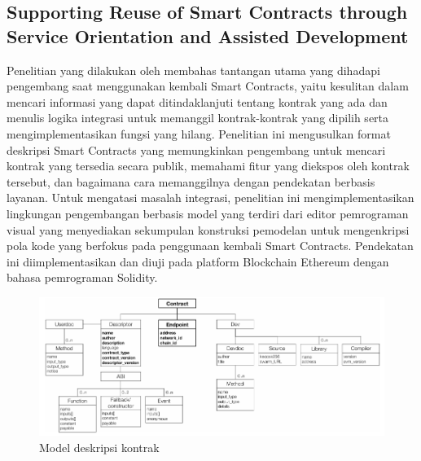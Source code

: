 \subsection{Supporting Reuse of Smart Contracts through Service Orientation and Assisted Development}
\label{subsec:supporting-reuse-smart-contracts}

Penelitian yang dilakukan oleh \cite{guida2019supporting} membahas tantangan utama yang dihadapi pengembang saat menggunakan kembali Smart Contracts, yaitu kesulitan dalam mencari informasi yang dapat ditindaklanjuti tentang kontrak yang ada dan menulis logika integrasi untuk memanggil kontrak-kontrak yang dipilih serta mengimplementasikan fungsi yang hilang. Penelitian ini mengusulkan format deskripsi Smart Contracts yang memungkinkan pengembang untuk mencari kontrak yang tersedia secara publik, memahami fitur yang diekspos oleh kontrak tersebut, dan bagaimana cara memanggilnya dengan pendekatan berbasis layanan. Untuk mengatasi masalah integrasi, penelitian ini mengimplementasikan lingkungan pengembangan berbasis model yang terdiri dari editor pemrograman visual yang menyediakan sekumpulan konstruksi pemodelan untuk mengenkripsi pola kode yang berfokus pada penggunaan kembali Smart Contracts. Pendekatan ini diimplementasikan dan diuji pada platform Blockchain Ethereum dengan bahasa pemrograman Solidity.

\begin{figure}[ht]
	\centering
	\includegraphics[width=1\textwidth]{resources/chapter-2/sc-model.png}
	\caption{Model deskripsi kontrak \parencite{guida2019supporting}}
	\label{image:sc-model}
\end{figure}

